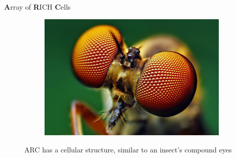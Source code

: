 \documentclass{beamer}
\begin{document}
\begin{frame}{\textbf{A}rray of \textbf{R}ICH \textbf{C}ells}
\begin{figure}
\begin{subfigure}{0.4\textwidth}
    \end{subfigure}%
    \hspace{1cm}
    \begin{subfigure}{0.3\textwidth}
      \includegraphics[width = 1.0\textwidth]{Plots/CompoundEyes.jpg}
    \end{subfigure}
    \caption{ARC has a cellular structure, similar to an insect's compound eyes}
  \end{figure}
\end{frame}
\end{document}
